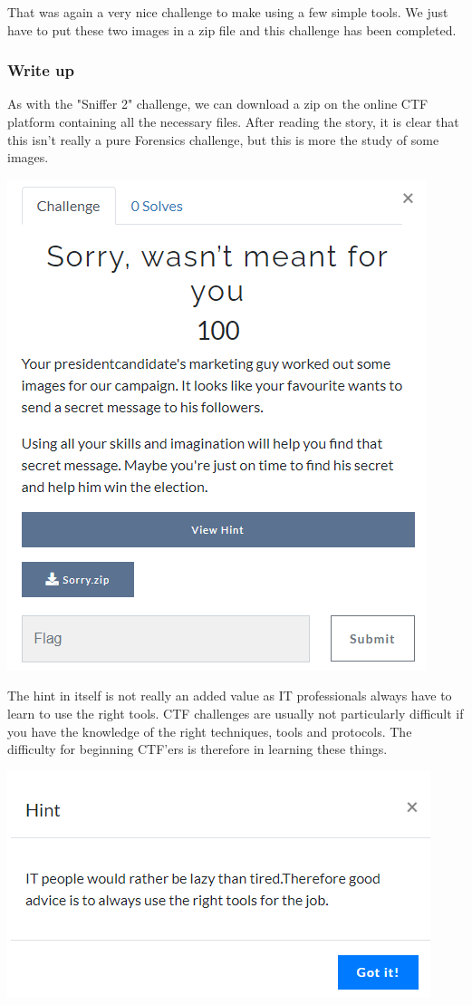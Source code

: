 \documentclass[../main.tex]{subfiles}
\begin{document}
That was again a very nice challenge to make using a few simple tools. We just have to put these two images in a zip file and this challenge has been completed.

\subsubsection{Write up}
As with the "Sniffer 2" challenge, we can download a zip on the online CTF platform containing all the necessary files. After reading the story, it is clear that this isn't really a pure Forensics challenge, but this is more the study of some images.

 \begin{center}
    \includegraphics[width=0.6\linewidth]{images/Robbe/sorry_writeup1.png}
\end{center}

\pagebreak
The hint in itself is not really an added value as IT professionals always have to learn to use the right tools. CTF challenges are usually not particularly difficult if you have the knowledge of the right techniques, tools and protocols. The difficulty for beginning CTF'ers is therefore in learning these things.
\begin{center}
    \includegraphics[width=0.6\linewidth]{images/Robbe/sorry_writeup2.png}
\end{center}
\end{document}

